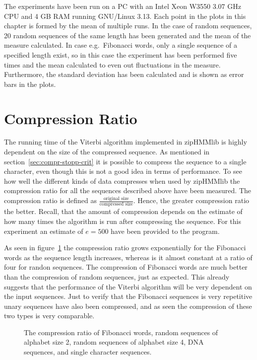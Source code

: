 The experiments have been run on a PC with an Intel Xeon W3550 $3.07$ GHz CPU
and 4 GB RAM running GNU/Linux 3.13. Each point in the plots in this chapter is
formed by the mean of multiple runs. In the case of random sequences, 20 random
sequences of the same length has been generated and the mean of the measure
calculated. In case e.g.\ Fibonacci words, only a single sequence of a
specified length exist, so in this case the experiment has been performed five
times and the mean calculated to even out fluctuations in the
measure. Furthermore, the standard deviation has been calculated and is shown
as error bars in the plots.

\section{Compression Ratio} 
\label{sec:compression-ratio}

The running time of the Viterbi algorithm implemented in zipHMMlib is highly
dependent on the size of the compressed sequence. As mentioned in
section~\ref{sec:compr-stopp-crit} it is possible to compress the sequence to a
single character, even though this is not a good idea in terms of
performance. To see how well the different kinds of data compresses when used
by zipHMMlib the compression ratio for all the sequences described above have
been measured. The compression ratio is defined as
$\frac{\text{original size}}{\text{compressed size}}$. Hence, the greater
compression ratio the better. Recall, that the amount of compression depends on
the estimate of how many times the algorithm is run after compressing the
sequence. For this experiment an estimate of $e = 500$ have been provided to
the program.

As seen in figure~\ref{fig:compression_ratio} the compression ratio grows
exponentially for the Fibonacci words as the sequence length increases, whereas
is it almost constant at a ratio of four for randon sequences. The compression
of Fibonacci words are much better than the compression of random sequences,
just as expected. This already suggests that the performance of the Viterbi
algorithm will be very dependent on the input sequences. Just to verify that
the Fibonacci sequences is very repetitive unary sequences have also been
compressed, and as seen the compression of these two types is very comparable.

\begin{figure}
  \centering
  
  \caption{The compression ratio of Fibonacci words, random sequences of
    alphabet size 2, random sequences of alphabet size 4, DNA
    sequences, and single character sequences.}
  \label{fig:compression_ratio}
\end{figure}

